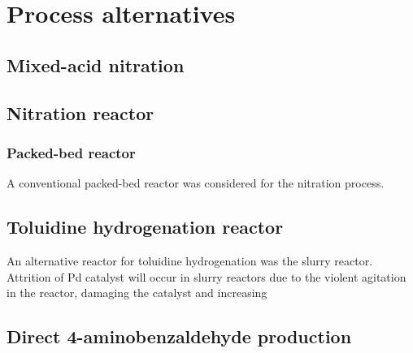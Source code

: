 \section{Process alternatives}
\label{app:alternatives}

\subsection{Mixed-acid nitration}
\label{mixed}

\subsection{Nitration reactor}
\label{nitrationreactor}
\subsubsection{Packed-bed reactor}
A conventional packed-bed reactor was considered for the nitration process. 

\subsection{Toluidine hydrogenation reactor}
\label{toluidine}
An alternative reactor for toluidine hydrogenation was the slurry reactor. Attrition of Pd catalyst will occur in slurry reactors due to the violent agitation in the reactor, damaging the catalyst and increasing 


\subsection{Direct 4-aminobenzaldehyde production}
\label{direct}
